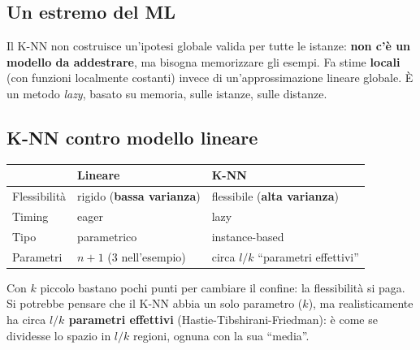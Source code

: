 \subsection{Un estremo del ML}\label{un-estremo-del-ml}

Il K-NN non costruisce un'ipotesi globale valida per tutte le istanze:
\textbf{non c'è un modello da addestrare}, ma bisogna memorizzare gli
esempi. Fa stime \textbf{locali} (con funzioni localmente costanti)
invece di un'approssimazione lineare globale. È un metodo \emph{lazy},
basato su memoria, sulle istanze, sulle distanze.

\subsection{K-NN contro modello
lineare}\label{k-nn-contro-modello-lineare}

{\def\LTcaptype{none} %
\begin{longtable}[]{@{}
  >{\raggedright\arraybackslash}p{}
  >{\raggedright\arraybackslash}p{}
  >{\raggedright\arraybackslash}p{}@{}}
\toprule\noalign{}
\begin{minipage}[b]{\linewidth}\raggedright
\end{minipage} & \begin{minipage}[b]{\linewidth}\raggedright
Lineare
\end{minipage} & \begin{minipage}[b]{\linewidth}\raggedright
K-NN
\end{minipage} \\
\midrule\noalign{}
\endhead
\bottomrule\noalign{}
\endlastfoot
Flessibilità & rigido (\textbf{bassa varianza}) & flessibile
(\textbf{alta varianza}) \\
Timing & eager & lazy \\
Tipo & parametrico & instance-based \\
Parametri & \(n+1\) (3 nell'esempio) & circa \(l/k\) ``parametri
effettivi'' \\
\end{longtable}
}

Con \(k\) piccolo bastano pochi punti per cambiare il confine: la
flessibilità si paga. Si potrebbe pensare che il K-NN abbia un solo
parametro (\(k\)), ma realisticamente ha circa \textbf{\(l/k\) parametri
effettivi} (Hastie-Tibshirani-Friedman): è come se dividesse lo spazio
in \(l/k\) regioni, ognuna con la sua ``media''.

